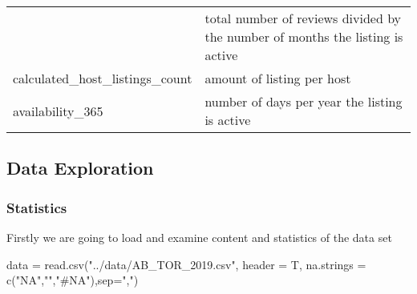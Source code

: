 \begin{longtable}[]{@{}ll@{}}
\begin{minipage}[t]{0.25\columnwidth}
\end{minipage} & \begin{minipage}[t]{0.69\columnwidth}\raggedright
total number of reviews divided by the number of months the listing is
active\strut
\end{minipage}\tabularnewline
\begin{minipage}[t]{0.25\columnwidth}\raggedright
calculated\_host\_listings\_count\strut
\end{minipage} & \begin{minipage}[t]{0.69\columnwidth}\raggedright
amount of listing per host\strut
\end{minipage}\tabularnewline
\begin{minipage}[t]{0.25\columnwidth}\raggedright
availability\_365\strut
\end{minipage} & \begin{minipage}[t]{0.69\columnwidth}\raggedright
number of days per year the listing is active\strut
\end{minipage}\tabularnewline
\bottomrule
\end{longtable}

\hypertarget{data-exploration}{%
\subsection{Data Exploration}\label{data-exploration}}

\hypertarget{statistics}{%
\subsubsection{Statistics}\label{statistics}}

Firstly we are going to load and examine content and statistics of the
data set

\begin{Schunk}
\begin{Sinput}
data = read.csv("../data/AB_TOR_2019.csv", header = T, 
                na.strings = c("NA","","#NA"),sep=",")
\end{Sinput}
\end{Schunk}

